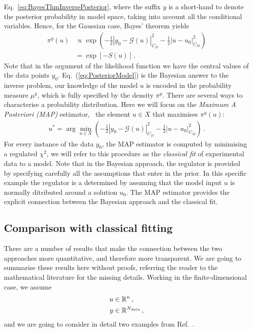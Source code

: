 Eq.~\ref{eq:BayesThmInversePosterior}, where the suffix $y$ is a short-hand to
denote the posterior probability in model space, taking into account all the
conditional variables. Hence, for the Gaussian case, Bayes' theorem yields
\begin{align}
  \label{eq:PosteriorModel}
  \pi^y(u) &\propto 
  \exp\left(
  -\frac12 \left| y_0 - \mathcal G(u) \right|_{C_D}^2
  -\frac12 \left| u - u_0 \right|_{C_M}^2
  \right)\\ 
  &= \exp\left[
    - S(u)
  \right]\, .
\end{align}
Note that in the argument of the likelihood function we have the central values
of the data points $y_0$. Eq.~(\ref{eq:PosteriorModel}) is the Bayesian answer
to the inverse problem, our knowledge of the model $u$ is encoded in the
probability measure $\mu^y$, which is fully specified by the density $\pi^y$.
There are several ways to characterise a probability distribution. Here we will
focus on the {\em Maximum A Posteriori (MAP)} estimator, \ie\ the element $u \in
X$ that maximises $\pi^y(u)$:
\begin{align}\label{eq:MAP}
  u^* = \arg\min_{u \in X} 
  \left(
  -\frac12 \left| y_0 - \mathcal G(u) \right|_{C_D}^2
  -\frac12 \left| u - u_0 \right|_{C_M}^2
  \right)\, .
\end{align}
For every instance of the data $y_0$, the MAP estimator is computed by
minimising a regulated $\chi^2$, we will refer to this procedure as the {\em
classical fit} of experimental data to a model. Note that in the Bayesian
approach, the regulator is provided by specifying carefully all the assumptions
that enter in the prior. In this specific example the regulator is a determined
by assuming that the model input $u$ is normally ditributed around a solution
$u_0$. The MAP estimator provides the explicit connection between the Bayesian
approach and the classical fit.

\subsection{Comparison with classical fitting}
\label{sec:comp-class-fit}

There are a number of results that make the connection between the two
approaches more quantitative, and therefore more transparent. We are
going to summarise these results here without proofs, referring the
reader to the mathematical literature for the missing details. Working
in the finite-dimensional case, we assume 
\begin{align*}
  u &\in \mathbb{R}^n \, ,\\
  y &\in \mathbb{R}^{N_{\rm data}}\, ,
\end{align*}
and we are going to consider in detail two examples from Ref.~\cite{StuartCore}.

